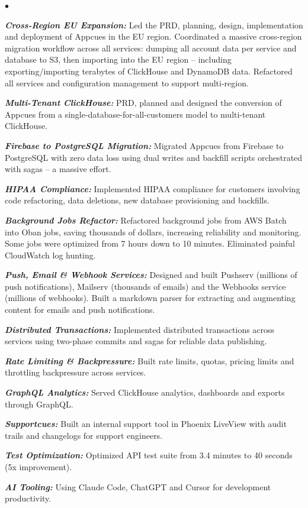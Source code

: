 \documentclass[a4paper]{article}
\newenvironment{achievements}{\begin{list}{$\bullet$}{\topsep 0pt \itemsep
  -2pt}}{\vspace*{4pt}\end{list}}
\newcommand{\emphasys}[1]{\textbf{\emph{#1}}}
\begin{document}
\begin{achievements}
  \item \emphasys{Cross-Region EU Expansion:} Led the PRD, planning, design, implementation and deployment of Appcues in the EU region. Coordinated a massive cross-region migration workflow across all services: dumping all account data per service and database to S3, then importing into the EU region -- including exporting/importing terabytes of ClickHouse and DynamoDB data. Refactored all services and configuration management to support multi-region.
  \item \emphasys{Multi-Tenant ClickHouse:} PRD, planned and designed the conversion of Appcues from a single-database-for-all-customers model to multi-tenant ClickHouse.
  \item \emphasys{Firebase to PostgreSQL Migration:} Migrated Appcues from Firebase to PostgreSQL with zero data loss using dual writes and backfill scripts orchestrated with sagas -- a massive effort.
  \item \emphasys{HIPAA Compliance:} Implemented HIPAA compliance for customers involving code refactoring, data deletions, new database provisioning and backfills.
  \item \emphasys{Background Jobs Refactor:} Refactored background jobs from AWS Batch into Oban jobs, saving thousands of dollars, increasing reliability and monitoring. Some jobs were optimized from 7 hours down to 10 minutes. Eliminated painful CloudWatch log hunting.
  \item \emphasys{Push, Email \& Webhook Services:} Designed and built Pushserv (millions of push notifications), Mailserv (thousands of emails) and the Webhooks service (millions of webhooks). Built a markdown parser for extracting and augmenting content for emails and push notifications.
  \item \emphasys{Distributed Transactions:} Implemented distributed transactions across services using two-phase commits and sagas for reliable data publishing.
  \item \emphasys{Rate Limiting \& Backpressure:} Built rate limits, quotas, pricing limits and throttling backpressure across services.
  \item \emphasys{GraphQL Analytics:} Served ClickHouse analytics, dashboards and exports through GraphQL.
  \item \emphasys{Supportcues:} Built an internal support tool in Phoenix LiveView with audit trails and changelogs for support engineers.
  \item \emphasys{Test Optimization:} Optimized API test suite from 3.4 minutes to 40 seconds (5x improvement).
  \item \emphasys{AI Tooling:} Using Claude Code, ChatGPT and Cursor for development productivity.
  \end{achievements}
\end{document}
